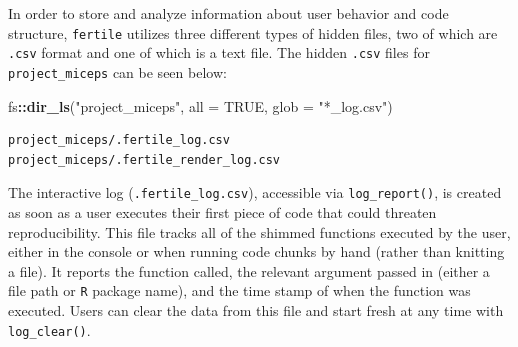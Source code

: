 \documentclass[12pt,twoside]{reedthesis}
\newenvironment{Shaded}{\begin{snugshade}}{\end{snugshade}}
\newcommand{\DataTypeTok}[1]{\textcolor[rgb]{0.13,0.29,0.53}{#1}}
\newcommand{\KeywordTok}[1]{\textcolor[rgb]{0.13,0.29,0.53}{\textbf{#1}}}
\newcommand{\NormalTok}[1]{#1}
\newcommand{\OperatorTok}[1]{\textcolor[rgb]{0.81,0.36,0.00}{\textbf{#1}}}
\newcommand{\OtherTok}[1]{\textcolor[rgb]{0.56,0.35,0.01}{#1}}
\newcommand{\StringTok}[1]{\textcolor[rgb]{0.31,0.60,0.02}{#1}}
\begin{document}
In order to store and analyze information about user behavior and code structure, \texttt{fertile} utilizes three different types of hidden files, two of which are \texttt{.csv} format and one of which is a text file. The hidden \texttt{.csv} files for \texttt{project\_miceps} can be seen below:
\begin{Shaded}
\begin{Highlighting}[]
\NormalTok{fs}\OperatorTok{::}\KeywordTok{dir_ls}\NormalTok{(}\StringTok{"project_miceps"}\NormalTok{, }\DataTypeTok{all =} \OtherTok{TRUE}\NormalTok{, }\DataTypeTok{glob =} \StringTok{"*_log.csv"}\NormalTok{)}
\end{Highlighting}
\end{Shaded}
\begin{verbatim}
project_miceps/.fertile_log.csv        project_miceps/.fertile_render_log.csv 
\end{verbatim}
The interactive log (\texttt{.fertile\_log.csv}), accessible via \texttt{log\_report()}, is created as soon as a user executes their first piece of code that could threaten reproducibility. This file tracks all of the shimmed functions executed by the user, either in the console or when running code chunks by hand (rather than knitting a file). It reports the function called, the relevant argument passed in (either a file path or \texttt{R} package name), and the time stamp of when the function was executed. Users can clear the data from this file and start fresh at any time with \texttt{log\_clear()}.
\end{document}
